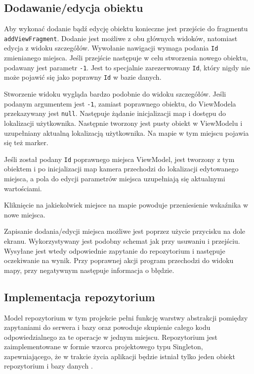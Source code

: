 \documentclass[polish,polish,a4paper,12pt]{article}
\begin{document}
	\subsection{Dodawanie/edycja obiektu}

	Aby wykonać dodanie bądź edycję obiektu konieczne jest przejście do fragmentu \texttt{addViewFragment}. Dodanie jest możliwe z obu głównych widoków, natomiast edycja z widoku szczegółów. Wywołanie nawigacji wymaga podania \texttt{Id} zmienianego miejsca. Jeśli przejście następuje w celu stworzenia nowego obiektu, podawany jest parametr \texttt{-1}. Jest to specjalnie zarezerwowany \texttt{Id}, który nigdy nie może pojawić się jako poprawny \texttt{Id} w bazie danych.

	Stworzenie widoku wygląda bardzo podobnie do widoku szczegółów. Jeśli podanym argumentem jest \texttt{-1}, zamiast poprawnego obiektu, do ViewModela przekazywany jest \texttt{null}. Następuje żądanie inicjalizacji map i dostępu do lokalizacji użytkownika. Następnie tworzony jest pusty obiekt w ViewModelu i uzupełniany aktualną lokalizacją użytkownika. Na mapie w tym miejscu pojawia się też marker.

	Jeśli został podany \texttt{Id} poprawnego miejsca ViewModel, jest tworzony z tym obiektem i po inicjalizacji map kamera przechodzi do lokalizacji edytowanego miejsca, a pola do edycji parametrów miejsca uzupełniają się aktualnymi wartościami.

	Kliknięcie na jakiekolwiek miejsce na mapie powoduje przeniesienie wskaźnika w nowe miejsca.

	Zapisanie dodania/edycji miejsca możliwe jest poprzez użycie przycisku na dole ekranu. Wykorzystywany jest podobny schemat jak przy usuwaniu i przejściu. Wysyłane jest wtedy odpowiednie zapytanie do repozytorium i następuje oczekiwanie na wynik. Przy poprawnej akcji program przechodzi do widoku mapy, przy negatywnym następuje informacja o błędzie.

	\subsection{Implementacja repozytorium}

	Model repozytorium w tym projekcie pełni funkcję warstwy abstrakcji pomiędzy zapytaniami do serwera i bazy oraz powoduje skupienie całego kodu odpowiedzialnego za te operacje w jednym miejscu. Repozytorium jest zaimplementowane w formie wzorca projektowego typu Singleton, zapewniającego, że w trakcie życia aplikacji będzie istniał tylko jeden obiekt repozytorium i bazy danych \cite{singletonwiki}.
\end{document}
